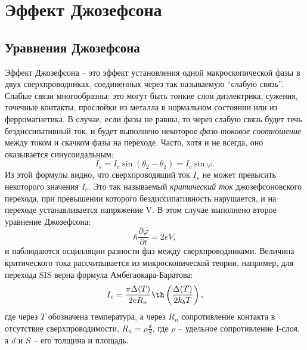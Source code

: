 \documentclass[12pt, twoside]{report}
\numberwithin{equation}{section}
\numberwithin{figure}{section}
\begin{document}
\section{Эффект Джозефсона}
\subsection{Уравнения Джозефсона}
Эффект Джозефсона\cite{Josephson1964} -- это эффект установления одной макроскопической фазы в двух сверхпроводниках, соединенных через так называемую ``слабую связь''. Слабые связи многообразны: это могут быть тонкие слои диэлектрика, сужения, точечные контакты, прослойки из металла в нормальном состоянии или из ферромагнетика. В случае, если фазы не равны, то через слабую связь будет течь бездиссипативный ток, и будет выполнено некоторое \textit{фазо-токовое соотношение} между током и скачком фазы на переходе. Часто, хотя и не всегда\cite{Golubov2004}, оно оказывается синусоидальным:
\begin{equation}
I_s = I_c \sin(\theta_2 - \theta_1) = I_c \sin\varphi.
\label{eq:CPR}
\end{equation}
Из этой формулы видно, что сверхпроводящий ток $I_s$ не может превысить некоторого значения $I_c$. Это так называемый \textit{критический ток} джозефсоновского перехода, при превышении которого бездиссипативность нарушается, и на переходе устанавливается напряжение V. В этом случае выполнено второе уравнение Джозефсона:
\begin{equation}
\hbar \frac{\partial \varphi}{\partial t} = 2eV,
\label{eq:2JE}
\end{equation}
и наблюдаются осцилляции разности фаз между сверхпроводниками. Величина критического тока рассчитывается из микроскопической теории, например, для перехода SIS верна формула Амбегаокара-Баратова:
\begin{equation}
I_c = \frac{\pi\Delta(T)}{2eR_n}\th\left(\frac{\Delta(T)}{2k_bT}\right),
\label{eq:Ic}
\end{equation}
где через $T$ обозначена температура, а через $R_n$ сопротивление контакта в отсутствие сверхпроводимости, $R_n = \rho\frac{d}{S}$, где $\rho$ -- удельное сопротивление I-слоя, а $d$ и $S$ -- его толщина и площадь.
\end{document}
